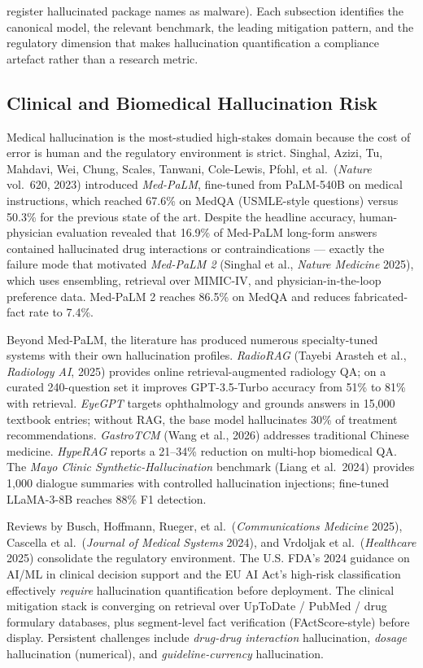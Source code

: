 \documentclass{article}
\begin{document}
register hallucinated package names as malware). Each subsection identifies the canonical model, the relevant benchmark, the leading mitigation pattern, and the regulatory dimension that makes hallucination quantification a compliance artefact rather than a research metric.

\subsection{Clinical and Biomedical Hallucination Risk}\label{clinical-and-biomedical-hallucination-risk}

Medical hallucination is the most-studied high-stakes domain because the cost of error is human and the regulatory environment is strict. Singhal, Azizi, Tu, Mahdavi, Wei, Chung, Scales, Tanwani, Cole-Lewis, Pfohl, et al.~(\emph{Nature} vol.~620, 2023) introduced \emph{Med-PaLM}, fine-tuned from PaLM-540B on medical instructions, which reached 67.6\% on MedQA (USMLE-style questions) versus 50.3\% for the previous state of the art. Despite the headline accuracy, human-physician evaluation revealed that 16.9\% of Med-PaLM long-form answers contained hallucinated drug interactions or contraindications --- exactly the failure mode that motivated \emph{Med-PaLM 2} (Singhal et al., \emph{Nature Medicine} 2025), which uses ensembling, retrieval over MIMIC-IV, and physician-in-the-loop preference data. Med-PaLM 2 reaches 86.5\% on MedQA and reduces fabricated-fact rate to 7.4\%.

Beyond Med-PaLM, the literature has produced numerous specialty-tuned systems with their own hallucination profiles. \emph{RadioRAG} (Tayebi Arasteh et al., \emph{Radiology AI}, 2025) provides online retrieval-augmented radiology QA; on a curated 240-question set it improves GPT-3.5-Turbo accuracy from 51\% to 81\% with retrieval. \emph{EyeGPT} \citep{chen2024unifiedhallucinati} targets ophthalmology and grounds answers in 15,000 textbook entries; without RAG, the base model hallucinates 30\% of treatment recommendations. \emph{GastroTCM} (Wang et al., 2026) addresses traditional Chinese medicine. \emph{HypeRAG} \citep{feng2026hyperragcombatingl} reports a 21--34\% reduction on multi-hop biomedical QA. The \emph{Mayo Clinic Synthetic-Hallucination} benchmark (Liang et al.~2024) provides 1,000 dialogue summaries with controlled hallucination injections; fine-tuned LLaMA-3-8B reaches 88\% F1 detection.

Reviews by Busch, Hoffmann, Rueger, et al.~(\emph{Communications Medicine} 2025), Cascella et al.~(\emph{Journal of Medical Systems} 2024), and Vrdoljak et al.~(\emph{Healthcare} 2025) consolidate the regulatory environment. The U.S. FDA's 2024 guidance on AI/ML in clinical decision support and the EU AI Act's high-risk classification effectively \emph{require} hallucination quantification before deployment. The clinical mitigation stack is converging on retrieval over UpToDate / PubMed / drug formulary databases, plus segment-level fact verification (FActScore-style) before display. Persistent challenges include \emph{drug-drug interaction} hallucination, \emph{dosage} hallucination (numerical), and \emph{guideline-currency} hallucination.
\end{document}
